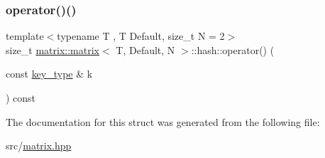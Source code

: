 \mbox{\label{structmatrix_1_1matrix_1_1hash_a85c814d52744c898763b5988498d5384}} 
\subsubsection{\texorpdfstring{operator()()}{operator()()}}
{\footnotesize\ttfamily template$<$typename T , T Default, size\+\_\+t N = 2$>$ \\
size\+\_\+t \hyperlink{structmatrix_1_1matrix}{matrix\+::matrix}$<$ T, Default, N $>$\+::hash\+::operator() (\begin{DoxyParamCaption}\item[{const \hyperlink{structmatrix_1_1matrix_af7b5498ac1b615cb9ef51bd185a2557e}{key\+\_\+type} \&}]{k }\end{DoxyParamCaption}) const\hspace{0.3cm}{\ttfamily [inline]}}



The documentation for this struct was generated from the following file\+:\begin{DoxyCompactItemize}
\item 
src/\hyperlink{matrix_8hpp}{matrix.\+hpp}\end{DoxyCompactItemize}
